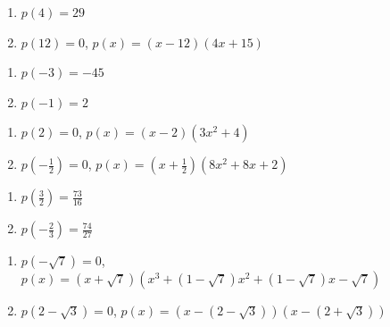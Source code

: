 \begin{multicols}{2}
\begin{enumerate}
\setcounter{enumi}{\value{HW}}

\item $p(4) = 29$
\item $p(12) =0$, $p(x) = (x-12)(4x+15)$

\setcounter{HW}{\value{enumi}}
\end{enumerate}
\end{multicols}


\begin{multicols}{2}
\begin{enumerate}
\setcounter{enumi}{\value{HW}}

\item $p(-3)=-45$
\item $p(-1)=2$

\setcounter{HW}{\value{enumi}}
\end{enumerate}
\end{multicols}

\begin{multicols}{2}
\begin{enumerate}
\setcounter{enumi}{\value{HW}}

\item $p(2) =0$, $p(x)= (x-2) \left(3x^2+4\right)$
\item $p\left(-\frac{1}{2}\right) = 0$, $p(x)  = \left(x+\frac{1}{2}\right)\left(8x^2+8x+2\right)$

\setcounter{HW}{\value{enumi}}
\end{enumerate}
\end{multicols}

\begin{multicols}{2}
\begin{enumerate}
\setcounter{enumi}{\value{HW}}

\item $p\left(\frac{3}{2}\right) = \frac{73}{16}$
\item $p\left(-\frac{2}{3}\right) = \frac{74}{27}$

\setcounter{HW}{\value{enumi}}
\end{enumerate}
\end{multicols}

\begin{enumerate}
\setcounter{enumi}{\value{HW}}

\item $p(-\sqrt{7}) = 0$, $p(x) = (x+\sqrt{7})\left(x^3+(1-\sqrt{7}) x^2+(1-\sqrt{7})x-\sqrt{7}  \right)$
\item $p(2-\sqrt{3}) =0$, $p(x) = (x-(2-\sqrt{3}))(x-(2+\sqrt{3})) $

\setcounter{HW}{\value{enumi}}
\end{enumerate}

